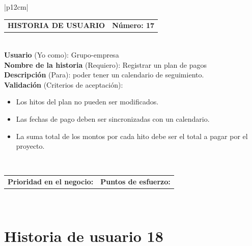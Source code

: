\documentclass[11pt,letterpaper]{report}
\begin{document}
	\begin{center}	
		\begin{tabular}{|p{12cm}|}
			\hline
			\begin{tabular}{c|c}
				\textbf{HISTORIA DE USUARIO} & \textbf{Número: 17} \\
			\end{tabular} \\ \hline
			\textbf{Usuario} (Yo como): Grupo-empresa \\ \hline
			\textbf{Nombre de la historia} (Requiero): Registrar un plan de pagos \\ \hline
			\textbf{Descripción} (Para): poder tener un calendario de seguimiento. \\ \hline
			\textbf{Validación} (Criterios de aceptación): \\
			\begin{minipage}{12cm}
				\begin{itemize}
					\item Los hitos del plan no pueden ser modificados.
					\item Las fechas de pago deben ser sincronizadas con un calendario.
					\item La suma total de los montos por cada hito debe ser el total a pagar por el proyecto.
				\end{itemize}
			\end{minipage} \\ \hline
			\begin{tabular}{c|c}
				\textbf{Prioridad en el negocio: } & \textbf{Puntos de esfuerzo: } \\
			\end{tabular} \\ \hline
		\end{tabular}
	\end{center}
	
	\section{Historia de usuario 18}
	
\end{document}
